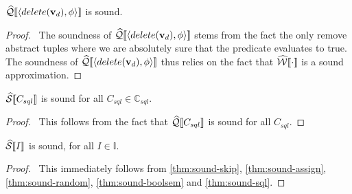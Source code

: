 \begin{conjecture}\label{thm:sound-update}
    $\widehat{\mathcal{Q}}\llbracket \langle delete(\mathbf{v}_d), \phi \rangle \rrbracket$ is sound.
\end{conjecture}
\begin{proof}
    \pfsketch\
    The soundness of $\widehat{\mathcal{Q}}\llbracket \langle delete(\mathbf{v}_d), \phi \rangle \rrbracket$ stems from the fact the only remove abstract tuples where we are absolutely sure that the predicate evaluates to true.
    The soundness of $\widehat{\mathcal{Q}}\llbracket \langle delete(\mathbf{v}_d), \phi \rangle \rrbracket$ thus relies on the fact that $\widehat{\mathcal{W}}\llbracket \cdot \rrbracket$ is a sound approximation.
\end{proof}

\begin{conjecture}\label{thm:sound-sql}
    $\widehat{\mathcal{S}} \llbracket C_{sql} \rrbracket$ is sound for all $C_{sql} \in \mathbb{C}_{sql}$.
\end{conjecture}
\begin{proof}
    \pf\
    This follows from the fact that $\widehat{\mathcal{Q}}\llbracket C_{sql} \rrbracket$ is sound for all $C_{sql}$.
\end{proof}

\begin{conjecture}
    $\widehat{\mathcal{S}} \llbracket I \rrbracket$ is sound, for all $I \in \mathbb{I}$.
\end{conjecture}
\begin{proof}
    \pf\
    This immediately follows from \autoref{thm:sound-skip}, \ref{thm:sound-assign}, \ref{thm:sound-random}, \ref{thm:sound-boolsem} and \ref{thm:sound-sql}.
\end{proof}
